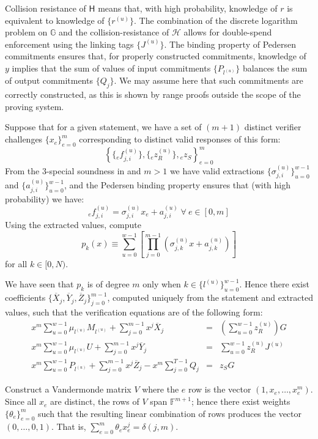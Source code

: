 \documentclass[draft]{article}
\newcommand{\G}{\mathbb{G}}
\newcommand{\F}{\mathbb{F}}
\newcommand{\hs}{\mathsf{H}}
\newcommand{\hp}{\mathcal{H}}
\newcommand{\sumj}{\sum_{j=0}^{m-1}}
\newcommand{\sumu}{\sum_{u=0}^{w-1}}
\begin{document}
Collision resistance of $\hs$ means that, with high probability, knowledge of $r$ is equivalent to knowledge of $\{r^{(u)}\}$.
The combination of the discrete logarithm problem on $\G$ and the collision-resistance of $\hp$ allows for double-spend enforcement using the linking tags $\{J^{(u)}\}$.
The binding property of Pedersen commitments ensures that, for properly constructed commitments, knowledge of $y$ implies that the sum of values of input commitments $\{P_{l^{(u)}}\}$ balances the sum of output commitments $\{Q_j\}$.
We may assume here that such commitments are correctly constructed, as this is shown by range proofs outside the scope of the proving system.

Suppose that for a given statement, we have a set of $(m+1)$ distinct verifier challenges $\{x_e\}_{e=0}^m$ corresponding to distinct valid responses of this form:
$$\left\{ \{{}_ef^{(u)}_{j,i}\}, \{{}_ez^{(u)}_R\}, {}_ez_S \right\}_{e=0}^m$$
From the $3$-special soundness in \cite{bootle} and $m > 1$ we have valid extractions $\{\sigma^{(u)}_{j,i}\}_{u=0}^{w-1}$ and $\{a^{(u)}_{j,i}\}_{u=0}^{w-1}$, and the Pedersen binding property ensures that (with high probability) we have:
$${}_ef^{(u)}_{j,i} = \sigma^{(u)}_{j,i}x_e + a^{(u)}_{j,i} \; \forall \: e \in [0,m]$$
Using the extracted values, compute
$$p_k(x) \equiv \sum_{u=0}^{w-1}\left[ \prod_{j=0}^{m-1} \left( \sigma^{(u)}_{j,k}x + a^{(u)}_{j,k} \right) \right]$$
for all $k \in [0,N)$.

We have seen that $p_k$ is of degree $m$ only when $k \in \{l^{(u)}\}_{u=0}^{w-1}$.
Hence there exist coefficients $\{\overline{X}_j,\overline{Y}_j,\overline{Z}_j\}_{j=0}^{m-1}$, computed uniquely from the statement and extracted values, such that the verification equations are of the following form:
\begin{eqnarray*}
x^m \sumu \mu_{l^{(u)}}M_{l^{(u)}} + \sumj x^j\overline{X}_j &=& \left( \sumu z^{(u)}_R \right)G \\
x^m \sumu \mu_{l^{(u)}}U + \sumj x^j\overline{Y}_j &=& \sumu z^{(u)}_RJ^{(u)} \\
x^m \sumu P_{l^{(u)}} + \sumj x^j\overline{Z}_j - x^m \sum_{j=0}^{T-1} Q_j &=& z_SG
\end{eqnarray*}

Construct a Vandermonde matrix $V$ where the $e$ row is the vector $(1,x_e,\ldots,x^m_e)$.
Since all $x_e$ are distinct, the rows of $V$ span $\F^{m+1}$; hence there exist weights $\{\theta_e\}_{e=0}^m$ such that the resulting linear combination of rows produces the vector $(0,\ldots,0,1)$.
That is, $\sum_{e=0}^m \theta_ex_e^j = \delta(j,m)$.
\end{document}
